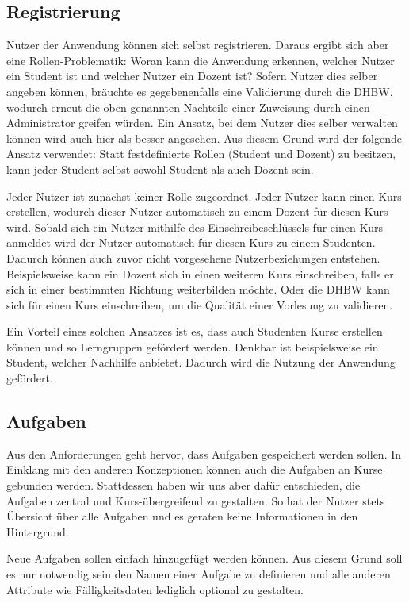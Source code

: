 \subsection{Registrierung}
Nutzer der Anwendung können sich selbst registrieren.
Daraus ergibt sich aber eine Rollen-Problematik: Woran kann die Anwendung erkennen, welcher Nutzer ein Student ist und welcher Nutzer ein Dozent ist?
Sofern Nutzer dies selber angeben können, bräuchte es gegebenenfalls eine Validierung durch die DHBW, wodurch erneut die oben genannten Nachteile einer Zuweisung durch einen Administrator greifen würden.
Ein Ansatz, bei dem Nutzer dies selber verwalten können wird auch hier als besser angesehen.
Aus diesem Grund wird der folgende Ansatz verwendet:
Statt festdefinierte Rollen (Student und Dozent) zu besitzen, kann jeder Student selbst sowohl Student als auch Dozent sein.

Jeder Nutzer ist zunächst keiner Rolle zugeordnet.
Jeder Nutzer kann einen Kurs erstellen, wodurch dieser Nutzer automatisch zu einem Dozent für diesen Kurs wird.
Sobald sich ein Nutzer mithilfe des Einschreibeschlüssels für einen Kurs anmeldet wird der Nutzer automatisch für diesen Kurs zu einem Studenten.
Dadurch können auch zuvor nicht vorgesehene Nutzerbeziehungen entstehen.
Beispielsweise kann ein Dozent sich in einen weiteren Kurs einschreiben, falls er sich in einer bestimmten Richtung weiterbilden möchte.
Oder die DHBW kann sich für einen Kurs einschreiben, um die Qualität einer Vorlesung zu validieren.


Ein Vorteil eines solchen Ansatzes ist es, dass auch Studenten Kurse erstellen können und so Lerngruppen gefördert werden.
Denkbar ist beispielsweise ein Student, welcher Nachhilfe anbietet.
Dadurch wird die Nutzung der Anwendung gefördert.








\subsection{Aufgaben}
Aus den Anforderungen geht hervor, dass Aufgaben gespeichert werden sollen. In Einklang mit den anderen Konzeptionen können auch die Aufgaben an Kurse gebunden werden. Stattdessen haben wir uns aber dafür entschieden, die Aufgaben zentral und Kurs-übergreifend zu gestalten. So hat der Nutzer stets Übersicht über alle Aufgaben und es geraten keine Informationen in den Hintergrund.

Neue Aufgaben sollen einfach hinzugefügt werden können. Aus diesem Grund soll es nur notwendig sein den Namen einer Aufgabe zu definieren und alle anderen Attribute wie Fälligkeitsdaten lediglich optional zu gestalten.

